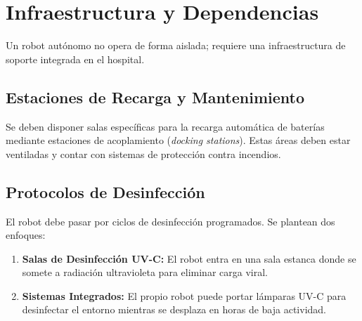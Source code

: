 \section{Infraestructura y Dependencias}
Un robot autónomo no opera de forma aislada; requiere una infraestructura de soporte integrada en el hospital.

\subsection{Estaciones de Recarga y Mantenimiento}
Se deben disponer salas específicas para la recarga automática de baterías mediante estaciones de acoplamiento (\textit{docking stations}). Estas áreas deben estar ventiladas y contar con sistemas de protección contra incendios.

\subsection{Protocolos de Desinfección}
El robot debe pasar por ciclos de desinfección programados. Se plantean dos enfoques:
\begin{enumerate}
    \item \textbf{Salas de Desinfección UV-C:} El robot entra en una sala estanca donde se somete a radiación ultravioleta para eliminar carga viral.
    \item \textbf{Sistemas Integrados:} El propio robot puede portar lámparas UV-C para desinfectar el entorno mientras se desplaza en horas de baja actividad.
\end{enumerate}
